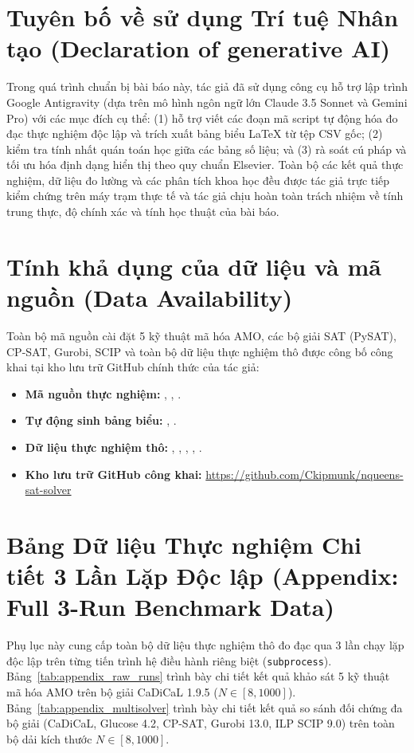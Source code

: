 \documentclass[11pt,a4paper]{article}
\begin{document}
\section*{Tuyên bố về sử dụng Trí tuệ Nhân tạo (Declaration of generative AI)}
Trong quá trình chuẩn bị bài báo này, tác giả đã sử dụng công cụ hỗ trợ lập trình Google Antigravity (dựa trên mô hình ngôn ngữ lớn Claude 3.5 Sonnet và Gemini Pro) với các mục đích cụ thể: (1) hỗ trợ viết các đoạn mã script tự động hóa đo đạc thực nghiệm độc lập và trích xuất bảng biểu LaTeX từ tệp CSV gốc; (2) kiểm tra tính nhất quán toán học giữa các bảng số liệu; và (3) rà soát cú pháp và tối ưu hóa định dạng hiển thị theo quy chuẩn Elsevier. Toàn bộ các kết quả thực nghiệm, dữ liệu đo lường và các phân tích khoa học đều được tác giả trực tiếp kiểm chứng trên máy trạm thực tế và tác giả chịu hoàn toàn trách nhiệm về tính trung thực, độ chính xác và tính học thuật của bài báo.

\section*{Tính khả dụng của dữ liệu và mã nguồn (Data Availability)}
Toàn bộ mã nguồn cài đặt 5 kỹ thuật mã hóa AMO, các bộ giải SAT (PySAT), CP-SAT, Gurobi, SCIP và toàn bộ dữ liệu thực nghiệm thô được công bố công khai tại kho lưu trữ GitHub chính thức của tác giả:
\begin{itemize}
    \item \textbf{Mã nguồn thực nghiệm:} , , .
    \item \textbf{Tự động sinh bảng biểu:} , .
    \item \textbf{Dữ liệu thực nghiệm thô:} , , , , .
    \item \textbf{Kho lưu trữ GitHub công khai:} \url{https://github.com/Ckipmunk/nqueens-sat-solver}
\end{itemize}

\appendix
\section{Bảng Dữ liệu Thực nghiệm Chi tiết 3 Lần Lặp Độc lập (Appendix: Full 3-Run Benchmark Data)}
Phụ lục này cung cấp toàn bộ dữ liệu thực nghiệm thô đo đạc qua 3 lần chạy lặp độc lập trên từng tiến trình hệ điều hành riêng biệt (\texttt{subprocess}). Bảng~\ref{tab:appendix_raw_runs} trình bày chi tiết kết quả khảo sát 5 kỹ thuật mã hóa AMO trên bộ giải CaDiCaL 1.9.5 ($N \in [8, 1000]$). Bảng~\ref{tab:appendix_multisolver} trình bày chi tiết kết quả so sánh đối chứng đa bộ giải (CaDiCaL, Glucose 4.2, CP-SAT, Gurobi 13.0, ILP SCIP 9.0) trên toàn bộ dải kích thước $N \in [8, 1000]$.
\end{document}
